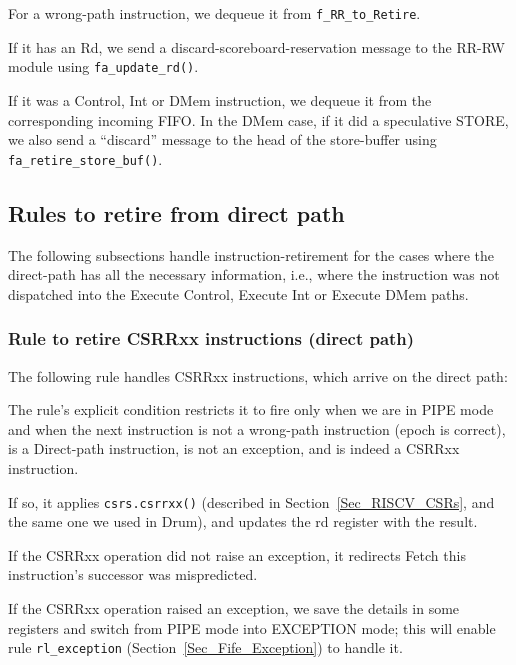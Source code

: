 For a wrong-path instruction, we dequeue it from \verb|f_RR_to_Retire|.

If it has an Rd, we send a discard-scoreboard-reservation message to
the RR-RW module using \verb|fa_update_rd()|.

If it was a Control, Int or DMem instruction, we dequeue it from the
corresponding incoming FIFO.  In the DMem case, if it did a
speculative STORE, we also send a ``discard'' message to the head of
the store-buffer using \verb|fa_retire_store_buf()|.




\subsection{Rules to retire from direct path}

The following subsections handle instruction-retirement for the cases
where the direct-path has all the necessary information, i.e., where
the instruction was not dispatched into the Execute Control, Execute
Int or Execute DMem paths.


\subsubsection{Rule to retire CSRRxx instructions (direct path)}

\label{Sec_Fife_Retire_CSRRxx}

The following rule handles CSRRxx instructions, which arrive on the direct path:



The rule's explicit condition restricts it to fire only when we are in
PIPE mode and when the next instruction is not a wrong-path
instruction (epoch is correct), is a Direct-path instruction, is not
an exception, and is indeed a CSRRxx instruction.

If so, it applies \verb|csrs.csrrxx()| (described in
Section~\ref{Sec_RISCV_CSRs}, and the same one we used in Drum), and
updates the rd register with the result.

If the CSRRxx operation did not raise an exception, it redirects Fetch
this instruction's successor was mispredicted.

If the CSRRxx operation raised an exception, we save the details in
some registers and switch from PIPE mode into EXCEPTION mode; this
will enable rule \verb|rl_exception|
(Section~\ref{Sec_Fife_Exception}) to handle it.

